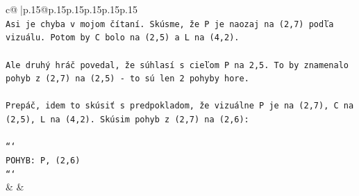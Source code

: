 \documentclass{article}
\begin{document}
{\begin{supertabular}{c@{$\;$}|p{.15\linewidth}@{}p{.15\linewidth}p{.15\linewidth}p{.15\linewidth}p{.15\linewidth}p{.15\linewidth}}
{{{\\ 
\texttt{Asi je chyba v mojom čítaní. Skúsme, že P je naozaj na (2,7) podľa vizuálu. Potom by C bolo na (2,5) a L na (4,2).} \\
\\ 
\texttt{Ale druhý hráč povedal, že súhlasí s cieľom P na 2,5. To by znamenalo pohyb z (2,7) na (2,5) {-} to sú len 2 pohyby hore.} \\
\\ 
\texttt{Prepáč, idem to skúsiť s predpokladom, že vizuálne P je na (2,7), C na (2,5), L na (4,2). Skúsim pohyb z (2,7) na (2,6):} \\
\\ 
\texttt{```} \\
\texttt{POHYB: P, (2,6)} \\
\texttt{```} \\
            }
        }
    }
    & & \\ \\


\end{supertabular}}
\end{document}
